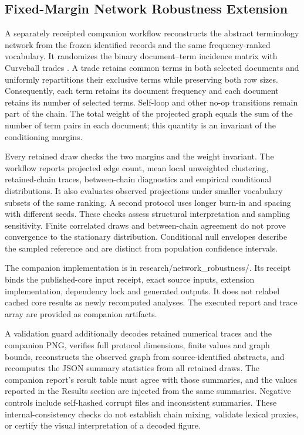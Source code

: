 \documentclass[
]{article}
\numberwithin{equation}{section}
\begin{document}
\subsection{Fixed-Margin Network Robustness
Extension}\label{sec:fixed_margin}

A separately receipted companion workflow reconstructs the abstract
terminology network from the frozen identified records and the same
frequency-ranked vocabulary. It randomizes the binary document--term
incidence matrix with Curveball trades
\citep{strona2014curveball, carstens2018curveball}. A trade retains
common terms in both selected documents and uniformly repartitions their
exclusive terms while preserving both row sizes. Consequently, each term
retains its document frequency and each document retains its number of
selected terms. Self-loop and other no-op transitions remain part of the
chain. The total weight of the projected graph equals the sum of the
number of term pairs in each document; this quantity is an invariant of
the conditioning margins.

Every retained draw checks the two margins and the weight invariant. The
workflow reports projected edge count, mean local unweighted clustering,
retained-chain traces, between-chain diagnostics and empirical
conditional distributions. It also evaluates observed projections under
smaller vocabulary subsets of the same ranking. A second protocol uses
longer burn-in and spacing with different seeds. These checks assess
structural interpretation and sampling sensitivity. Finite correlated
draws and between-chain agreement do not prove convergence to the
stationary distribution. Conditional null envelopes describe the sampled
reference and are distinct from population confidence intervals.

The companion implementation is in research/network\_robustness/. Its
receipt binds the published-core input receipt, exact source inputs,
extension implementation, dependency lock and generated outputs. It does
not relabel cached core results as newly recomputed analyses. The
executed report and trace array are provided as companion artifacts.

A validation guard additionally decodes retained numerical traces and
the companion PNG, verifies full protocol dimensions, finite values and
graph bounds, reconstructs the observed graph from source-identified
abstracts, and recomputes the JSON summary statistics from all retained
draws. The companion report's result table must agree with those
summaries, and the values reported in the Results section are injected
from the same summaries. Negative controls include self-hashed corrupt
files and inconsistent summaries. These internal-consistency checks do
not establish chain mixing, validate lexical proxies, or certify the
visual interpretation of a decoded figure.
\end{document}
